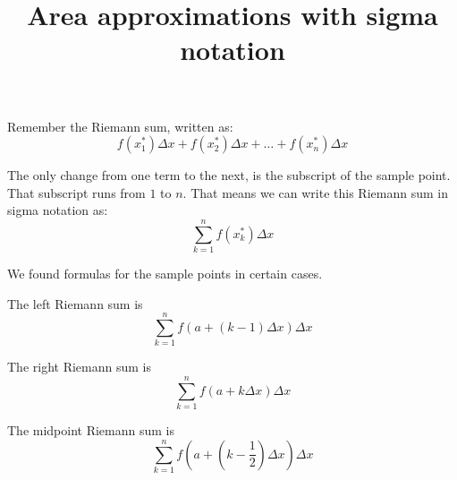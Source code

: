 \documentclass{ximera}
\title[Dig-In:]{Area approximations with sigma notation}
\begin{document}
\begin{abstract}
\end{abstract}
\maketitle

Remember the Riemann sum, written as:
\[ f(x_1^*) \Delta x + f(x_2^*) \Delta x + \ldots + f(x_n^*) \Delta x\]

The only change from one term to the next, is the subscript of the sample point.
That subscript runs from $1$ to $n$.  That means we can write this Riemann sum
in sigma notation as:
\[ \sum_{k=1}^n f(x_k^*) \Delta x \]

We found formulas for the sample points in certain cases.

The left Riemann sum is
\[ \sum_{k=1}^n f(a + (k-1)\Delta x) \Delta x \]

The right Riemann sum is
\[ \sum_{k=1}^n f(a + k \Delta x) \Delta x \]

The midpoint Riemann sum is
\[ \sum_{k=1}^n f\left(a + \left(k-\frac{1}{2}\right)\Delta x\right) \Delta x \]
  
\end{document}
